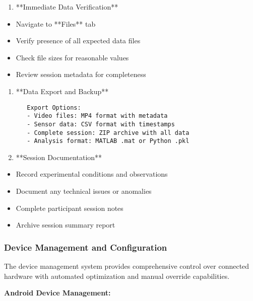 \documentclass[12pt,a4paper]{article}
\begin{document}
\begin{enumerate}
\item **Immediate Data Verification**
\end{enumerate}
\begin{itemize}
\item Navigate to **Files** tab
\item Verify presence of all expected data files
\item Check file sizes for reasonable values
\item Review session metadata for completeness

\end{itemize}
\begin{enumerate}
\item **Data Export and Backup**
\begin{verbatim}
   Export Options:
   - Video files: MP4 format with metadata
   - Sensor data: CSV format with timestamps
   - Complete session: ZIP archive with all data
   - Analysis format: MATLAB .mat or Python .pkl
\end{verbatim}

\item **Session Documentation**
\end{enumerate}
\begin{itemize}
\item Record experimental conditions and observations
\item Document any technical issues or anomalies
\item Complete participant session notes
\item Archive session summary report

\end{itemize}
\subsubsection{Device Management and Configuration}

The device management system provides comprehensive control over connected hardware with automated optimization and
manual override capabilities.

\textbf{Android Device Management:}
\end{document}
